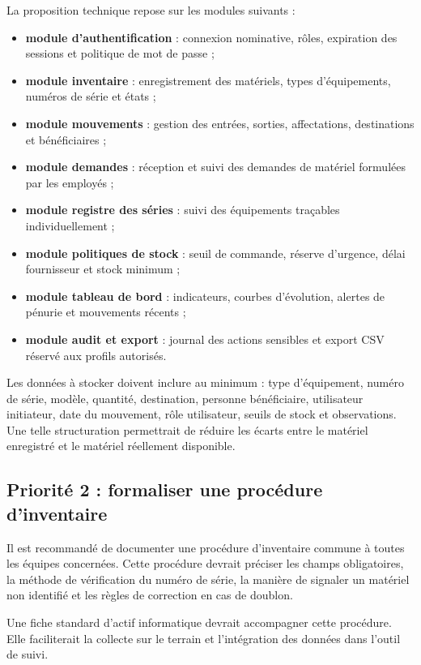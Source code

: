 \documentclass[12pt,a4paper]{report}
\begin{document}
La proposition technique repose sur les modules suivants :

\begin{itemize}[label=--]
    \item \textbf{module d'authentification} : connexion nominative, rôles, expiration des sessions et politique de mot de passe ;
    \item \textbf{module inventaire} : enregistrement des matériels, types d'équipements, numéros de série et états ;
    \item \textbf{module mouvements} : gestion des entrées, sorties, affectations, destinations et bénéficiaires ;
    \item \textbf{module demandes} : réception et suivi des demandes de matériel formulées par les employés ;
    \item \textbf{module registre des séries} : suivi des équipements traçables individuellement ;
    \item \textbf{module politiques de stock} : seuil de commande, réserve d'urgence, délai fournisseur et stock minimum ;
    \item \textbf{module tableau de bord} : indicateurs, courbes d'évolution, alertes de pénurie et mouvements récents ;
    \item \textbf{module audit et export} : journal des actions sensibles et export CSV réservé aux profils autorisés.
\end{itemize}

Les données à stocker doivent inclure au minimum : type d'équipement, numéro de série, modèle, quantité, destination, personne bénéficiaire, utilisateur initiateur, date du mouvement, rôle utilisateur, seuils de stock et observations. Une telle structuration permettrait de réduire les écarts entre le matériel enregistré et le matériel réellement disponible.

\subsection{Priorité 2 : formaliser une procédure d'inventaire}

Il est recommandé de documenter une procédure d'inventaire commune à toutes les équipes concernées. Cette procédure devrait préciser les champs obligatoires, la méthode de vérification du numéro de série, la manière de signaler un matériel non identifié et les règles de correction en cas de doublon.

Une fiche standard d'actif informatique devrait accompagner cette procédure. Elle faciliterait la collecte sur le terrain et l'intégration des données dans l'outil de suivi.
\end{document}
